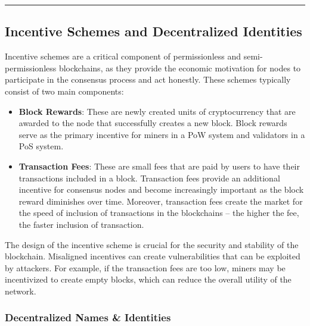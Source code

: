 \begin{center}\rule{0.5\linewidth}{0.5pt}\end{center}


\subsection{Incentive Schemes and Decentralized
	Identities}\label{section-5-incentive-schemes-and-decentralized-identities}


Incentive schemes are a critical component of permissionless and
semi-permissionless blockchains, as they provide the economic motivation
for nodes to participate in the consensus process and act honestly.
These schemes typically consist of two main components:

\begin{itemize}
	\tightlist
	\item
	\textbf{Block Rewards}: These are newly created units of
	cryptocurrency that are awarded to the node that successfully creates
	a new block. Block rewards serve as the primary incentive for miners
	in a PoW system and validators in a PoS system.
	\item
	\textbf{Transaction Fees}: These are small fees that are paid by users
	to have their transactions included in a block. Transaction fees
	provide an additional incentive for consensus nodes and become
	increasingly important as the block reward diminishes over time.
	Moreover, transaction fees create the market for the speed of inclusion of transactions in the blockchains -- the higher the fee, the faster inclusion of transaction.
\end{itemize}

The design of the incentive scheme is crucial for the security and
stability of the blockchain. Misaligned incentives can create
vulnerabilities that can be exploited by attackers. For example, if the
transaction fees are too low, miners may be incentivized to create empty
blocks, which can reduce the overall utility of the network.

\subsubsection{Decentralized Names \&
	Identities}\label{decentralized-names-identities}

